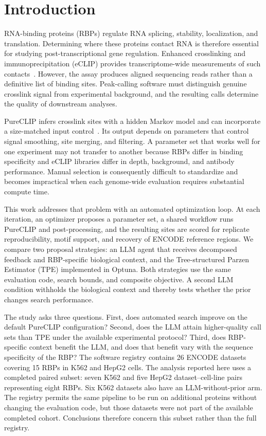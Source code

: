 \section{Introduction}
\label{introduction}

RNA-binding proteins (RBPs) regulate RNA splicing, stability, localization, and
translation. Determining where these proteins contact RNA is therefore essential
for studying post-transcriptional gene regulation. Enhanced crosslinking and
immunoprecipitation (eCLIP) provides transcriptome-wide measurements of such
contacts~\parencite{vannostrand2016}. However, the assay produces aligned
sequencing reads rather than a definitive list of binding sites. Peak-calling
software must distinguish genuine crosslink signal from experimental background,
and the resulting calls determine the quality of downstream analyses.

PureCLIP infers crosslink sites with a hidden Markov model and can incorporate a
size-matched input control~\parencite{krakau2017}. Its output depends on parameters
that control signal smoothing, site merging, and filtering. A parameter set that
works well for one experiment may not transfer to another because RBPs differ in
binding specificity and eCLIP libraries differ in depth, background, and antibody
performance. Manual selection is consequently difficult to standardize and
becomes impractical when each genome-wide evaluation requires substantial
compute time.

This work addresses that problem with an automated optimization loop. At each
iteration, an optimizer proposes a parameter set, a shared workflow runs
PureCLIP and post-processing, and the resulting sites are scored for replicate
reproducibility, motif support, and recovery of ENCODE reference regions. We
compare two proposal strategies: an LLM agent that receives decomposed feedback
and RBP-specific biological context, and the Tree-structured Parzen Estimator
(TPE) implemented in Optuna. Both strategies use the same evaluation code,
search bounds, and composite objective. A second LLM condition withholds the
biological context and thereby tests whether the prior changes search performance.

The study asks three questions. First, does automated search improve on the
default PureCLIP configuration? Second, does the LLM attain higher-quality call
sets than TPE under the available experimental protocol? Third, does RBP-specific
context benefit the LLM, and does that benefit vary with the sequence specificity
of the RBP? The software registry contains 26 ENCODE datasets covering 15 RBPs in
K562 and HepG2 cells. The analysis reported here uses a completed paired subset:
seven K562 and five HepG2 dataset--cell-line pairs representing eight RBPs. Six
K562 datasets also have an LLM-without-prior arm. The registry permits the same
pipeline to be run on additional proteins without changing the evaluation code,
but those datasets were not part of the available completed cohort. Conclusions
therefore concern this subset rather than the full registry.
